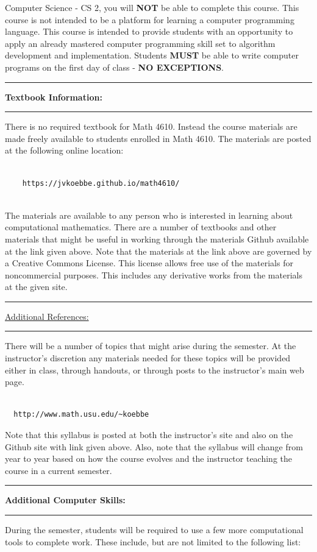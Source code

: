 \documentclass[10pt,fleqn]{article}
\begin{document}
Computer Science - CS 2, you will {\bf NOT} be able to complete this course.
This course is not intended to be a platform for learning a computer programming
language. This course is intended to provide students with an opportunity to
apply an already mastered computer programming skill set to algorithm
development and implementation. Students {\bf MUST} be able to write computer
programs on the first day of class - {\bf NO EXCEPTIONS}.
\vskip0.1in\hrule\vskip0.1in
\noindent
{\bf Textbook Information:}
\vskip0.1in\hrule\vskip0.1in
\noindent
There is no required textbook for Math 4610. Instead the course materials are
made freely available to students enrolled in Math 4610. The materials are
posted at the following online location:
\begin{verbatim}

    https://jvkoebbe.github.io/math4610/
 
\end{verbatim}
\noindent
The materials are available to any person who is interested in learning about
computational mathematics. There are a number of textbooks and other materials
that might be useful in working through the materials Github available at the
link given above. Note that the materials at the link above are governed by a
Creative Commons License. This license allows free use of the materials for
noncommercial purposes. This includes any derivative works from the materials at
the given site.
\vskip0.1in\hrule\vskip0.1in
\noindent
\underline{Additional References:}
\vskip0.1in\hrule\vskip0.1in
\noindent
There will be a number of topics that might arise during the semester. At the
instructor's discretion any materials needed for these topics will be provided
either in class, through handouts, or through posts to the instructor's main
web page.
\begin{verbatim}

  http://www.math.usu.edu/~koebbe

\end{verbatim}
Note that this syllabus is posted at both the instructor's site and also on the
Github site with link given above. Also, note that the syllabus will change from
year to year based on how the course evolves and the instructor teaching the
course in a current semester.
\vskip0.1in\hrule\vskip0.1in \noindent
{\bf Additional Computer Skills:}
\vskip0.1in\hrule\vskip0.1in
\noindent
During the semester, students will be required to use a few more computational
tools to complete work. These include, but are not limited to the following
list:
\end{document}
